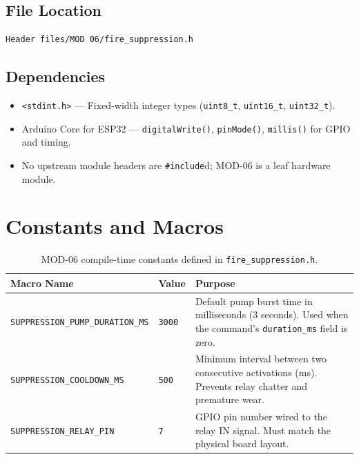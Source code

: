 \documentclass[12pt]{article}
\begin{document}
\subsection{File Location}

\begin{lstlisting}[style=cstyle, numbers=none]
Header files/MOD 06/fire_suppression.h
\end{lstlisting}

\subsection{Dependencies}

\begin{itemize}[leftmargin=1.5em]
  \item \texttt{<stdint.h>} --- Fixed-width integer types (\texttt{uint8\_t}, \texttt{uint16\_t}, \texttt{uint32\_t}).
  \item Arduino Core for ESP32 --- \texttt{digitalWrite()}, \texttt{pinMode()}, \texttt{millis()} for GPIO and timing.
  \item No upstream module headers are \texttt{\#include}d; MOD-06 is a leaf hardware module.
\end{itemize}

\section{Constants and Macros}

\begin{table}[H]
\centering\small
\begin{tabularx}{\textwidth}{L{5.5cm} L{2.5cm} X}
\toprule
\textbf{Macro Name} & \textbf{Value} & \textbf{Purpose} \\
\midrule
\texttt{SUPPRESSION\_PUMP\_DURATION\_MS} & \texttt{3000} & Default pump burst time in milliseconds (3 seconds). Used when the command's \texttt{duration\_ms} field is zero. \\[4pt]
\texttt{SUPPRESSION\_COOLDOWN\_MS} & \texttt{500} & Minimum interval between two consecutive activations (ms). Prevents relay chatter and premature wear. \\[4pt]
\texttt{SUPPRESSION\_RELAY\_PIN} & \texttt{7} & GPIO pin number wired to the relay IN signal. Must match the physical board layout. \\
\bottomrule
\end{tabularx}
\caption{MOD-06 compile-time constants defined in \texttt{fire\_suppression.h}.}
\end{table}
\end{document}
